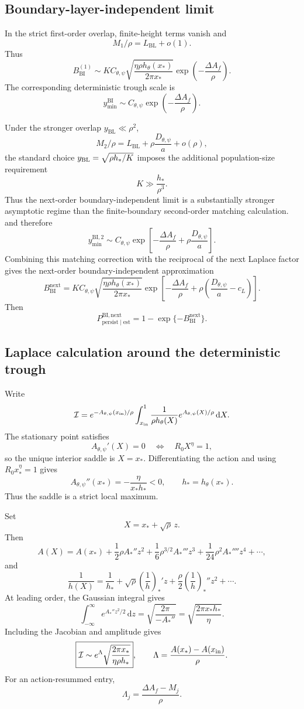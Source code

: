 \documentclass[11pt]{article}
\newcommand{\hth}{h_\theta}
\newcommand{\Cpsi}{C_{\theta,\psi}}
\newcommand{\Dpsi}{D_{\theta,\psi}}
\newcommand{\xs}{x_*}
\newcommand{\yin}{y_{\mathrm{BL}}}
\newcommand{\dd}{\,\mathrm{d}}
\begin{document}
\subsection{Boundary-layer-independent limit}
In the strict first-order overlap, finite-height terms vanish and
\[
M_1/\rho=L_{\mathrm{BL}}+o(1).
\]
Thus
\[
B_{\mathrm{BI}}^{(1)}
\sim
K\Cpsi
\sqrt{\frac{\eta\rho\hth(\xs)}{2\pi\xs}}
\exp\left(-\frac{\Delta A_f}{\rho}\right).
\]
The corresponding deterministic trough scale is
\[
y_{\min}^{\mathrm{BI}}
\sim
\Cpsi\exp\left(-\frac{\Delta A_f}{\rho}\right).
\]

Under the stronger overlap \(\yin\ll\rho^2\),
\[
M_2/\rho
=L_{\mathrm{BL}}+\rho\frac{\Dpsi}{a}+o(\rho),
\]
the standard choice \(y_{\rm BL}=\sqrt{\rho h_*/K}\) imposes the additional population-size requirement
\[
K\gg \frac{h_*}{\rho^3}.
\]
Thus the next-order boundary-independent limit is a substantially stronger asymptotic regime than the finite-boundary second-order matching calculation.
and therefore
\[
y_{\min}^{\mathrm{BI},2}
\sim
\Cpsi
\exp\left[-\frac{\Delta A_f}{\rho}+\rho\frac{\Dpsi}{a}\right].
\]
Combining this matching correction with the reciprocal of the next Laplace factor gives the next-order boundary-independent approximation
\[
B_{\mathrm{BI}}^{\mathrm{next}}
=
K\Cpsi
\sqrt{\frac{\eta\rho\hth(\xs)}{2\pi\xs}}
\exp\left[
-\frac{\Delta A_f}{\rho}
+\rho\left(\frac{\Dpsi}{a}-c_L\right)
\right].
\]
Then
\[
P_{\mathrm{persist}\mid\mathrm{est}}^{\mathrm{BI,next}}
=1-\exp\{-B_{\mathrm{BI}}^{\mathrm{next}}\}.
\]


\subsection{Laplace calculation around the deterministic trough}
Write
\[
\mathcal I=e^{-A_{\theta,\psi}(x_{\rm in})/\rho}
\int_{x_{\rm in}}^1\frac1{\rho h_\theta(X)}e^{A_{\theta,\psi}(X)/\rho}\dd X.
\]
The stationary point satisfies
\[
A_{\theta,\psi}'(X)=0
\quad\Longleftrightarrow\quad
R_0X^\eta=1,
\]
so the unique interior saddle is \(X=x_*\). Differentiating the action and using \(R_0x_*^\eta=1\) gives
\[
A_{\theta,\psi}''(x_*)=-\frac{\eta}{x_*h_*}<0,
\qquad h_*=h_\theta(x_*).
\]
Thus the saddle is a strict local maximum.

Set
\[
X=x_*+\sqrt\rho\,z.
\]
Then
\[
A(X)=A(x_*)+\frac12\rho A_*''z^2
+\frac16\rho^{3/2}A_*'''z^3
+\frac1{24}\rho^2A_*''''z^4+\cdots,
\]
and
\[
\frac1{h(X)}=\frac1{h_*}
+\sqrt\rho\left(\frac1h\right)_*'z
+\frac\rho2\left(\frac1h\right)_*''z^2+\cdots.
\]
At leading order, the Gaussian integral gives
\[
\int_{-\infty}^{\infty}e^{A_*''z^2/2}\dd z
=\sqrt{\frac{2\pi}{-A_*''}}
=\sqrt{\frac{2\pi x_*h_*}{\eta}}.
\]
Including the Jacobian and amplitude gives
\[
\boxed{
\mathcal I\sim e^\Lambda
\sqrt{\frac{2\pi x_*}{\eta\rho h_*}}
},
\qquad
\Lambda=\frac{A(x_*)-A(x_{\rm in})}{\rho}.
\]
For an action-resummed entry,
\[
\Lambda_j=\frac{\Delta A_f-M_j}{\rho}.
\]
\end{document}
